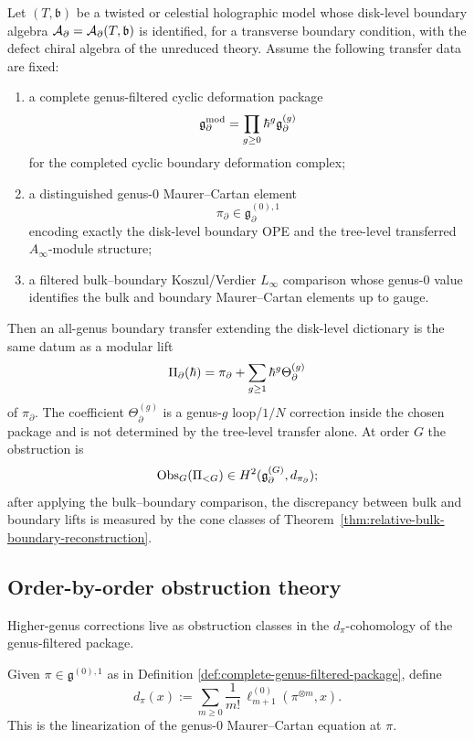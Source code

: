 \begin{theorem}
\label{thm:modular-twisted-celestial-transfer}
Let $(T,\mathfrak b)$ be a twisted or celestial holographic model whose disk-level boundary
algebra $\mathcal A_\partial=\mathcal A_\partial(T,\mathfrak b)$ is identified, for a transverse boundary
condition, with the defect chiral algebra of the unreduced theory. Assume the following transfer
data are fixed:
\begin{enumerate}[label=\textup{(\roman*)}]
\item a complete genus-filtered cyclic deformation package
\[
\mathfrak g^{\mathrm{mod}}_\partial=\prod_{g\ge 0}\hbar^g\mathfrak g^{(g)}_\partial
\]
for the completed cyclic boundary deformation complex;
\item a distinguished genus-$0$ Maurer--Cartan element
\[
\pi_\partial\in \mathfrak g_\partial^{(0),1}
\]
encoding exactly the disk-level boundary OPE and the tree-level transferred $A_\infty$-module
structure;
\item a filtered bulk--boundary Koszul/Verdier $L_\infty$ comparison whose genus-$0$ value
identifies the bulk and boundary Maurer--Cartan elements up to gauge.
\end{enumerate}
Then an all-genus boundary transfer extending the disk-level dictionary is the same datum as a
modular lift
\[
\Pi_\partial(\hbar)=\pi_\partial+\sum_{g\ge 1}\hbar^g\Theta_\partial^{(g)}
\]
of $\pi_\partial$.  The coefficient $\Theta_\partial^{(g)}$ is a genus-$g$ loop/$1/N$ correction
inside the chosen package and is not determined by the tree-level transfer alone.  At order $G$
the obstruction is
\[
\operatorname{Obs}_G(\Pi_{<G})\in H^2(\mathfrak g_\partial^{(G)},d_{\pi_\partial});
\]
after applying the bulk--boundary comparison, the discrepancy between bulk and boundary lifts is
measured by the cone classes of Theorem~\ref{thm:relative-bulk-boundary-reconstruction}.
\end{theorem}

\subsection{Order-by-order obstruction theory}
\label{subsec:order-by-order-obstruction-theory}

Higher-genus corrections live as obstruction classes in the $d_\pi$-cohomology of the genus-filtered package.

\begin{definition}
\label{def:twisted-differential}
Given $\pi\in\mathfrak g^{(0),1}$ as in Definition
\ref{def:complete-genus-filtered-package}, define
\begin{equation}
\label{eq:twisted-differential}
d_\pi(x):=\sum_{m\ge 0}\frac1{m!}\,\ell_{m+1}^{(0)}(\pi^{\otimes m},x).
\end{equation}
This is the linearization of the genus-$0$ Maurer--Cartan equation at $\pi$.
\end{definition}

